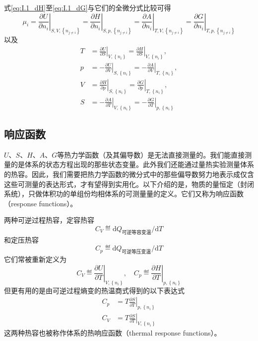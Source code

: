 \documentclass[main.tex]{subfiles}
\begin{document}
式\eqref{eq:I.1_dH}至\eqref{eq:I.1_dG}与它们的全微分式比较可得
\begin{equation}
    \mu_i=\left.\frac{\partial U}{\partial n_i}\right|_{S,V,\left\{n_{j\neq i}\right\}}
    =\left.\frac{\partial H}{\partial n_i}\right|_{S,p,\left\{n_{j\neq i}\right\}}
    =\left.\frac{\partial A}{\partial n_i}\right|_{T,V,\left\{n_{j\neq i}\right\}}
    =\left.\frac{\partial G}{\partial n_i}\right|_{T,p,\left\{n_{j\neq i}\right\}}\label{eq:I.1_first_order_partial_mu}
\end{equation}
以及
\begin{align}
    T & =\left.\frac{\partial U}{\partial S}\right|_{V,\left\{n_i\right\}}=\left.\frac{\partial H}{\partial S}\right|_{V,\left\{n_i\right\}},\label{eq:I.1_first_order_partial_T}   \\
    p & =-\left.\frac{\partial U}{\partial V}\right|_{S,\left\{n_i\right\}}=-\left.\frac{\partial A}{\partial V}\right|_{T,\left\{n_i\right\}},\label{eq:I.1_first_order_partial_p} \\
    V & =\left.\frac{\partial H}{\partial p}\right|_{S,\left\{n_i\right\}}=\left.\frac{\partial G}{\partial p}\right|_{T,\left\{n_i\right\}},\label{eq:I.1_first_order_partial_V}   \\
    S & =-\left.\frac{\partial A}{\partial T}\right|_{V,\left\{n_i\right\}}=-\left.\frac{\partial G}{\partial T}\right|_{p,\left\{n_i\right\}}\label{eq:I.1_first_order_partial_S}
\end{align}

\subsection{响应函数}
$U$、$S$、$H$、$A$、$G$等热力学函数（及其偏导数）是无法直接测量的。我们能直接测量的是体系的状态方程出现的那些状态变量。此外我们还能通过量热实验测量体系的热容。因此，我们需要把热力学函数的微分式中的那些偏导数努力地表示成仅含这些可测量的表达形式，才有望得到实用化。以下介绍的是，物质的量恒定（封闭系统），只做体积功的单组份均相体系的可测量量的定义。它们又称为响应函数（response functions）。

两种可逆过程热容，定容热容
\[C_V\eqdef\mathrm{d} Q_\text{可逆等容变温}/\mathrm{d}T\]
和定压热容
\[C_p\eqdef\mathrm{d} Q_\text{可逆等压变温}/\mathrm{d}T\]
它们常被重新定义为
\[C_V\eqdef\left.\frac{\partial U}{\partial T}\right|_{V,\left\{n_i\right\}},\quad C_p\eqdef\left.\frac{\partial H}{\partial T}\right|_{p,\left\{n_i\right\}}\]
但更有用的是由可逆过程熵变的热温商式得到的以下表达式
\begin{align}
    C_p & =T\left.\frac{\partial S}{\partial T}\right|_{p,\left\{n_i\right\}}\label{eq:I.1_heat_capacity_entropy_p} \\
    C_V & =T\left.\frac{\partial S}{\partial T}\right|_{V,\left\{n_i\right\}}\label{eq:I.1_heat_capacity_entropy_V}
\end{align}
这两种热容也被称作体系的热响应函数（thermal response functions）。
\end{document}

